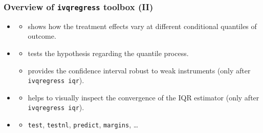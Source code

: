 \documentclass[11pt]{beamer}
\begin{document}
\begin{frame}
  \frametitle{Overview of {\tt ivqregress} toolbox (II) } 
  \begin{itemize}

    \setlength\itemsep{1.5em}

    \item {}
      \begin{itemize}
	\item {} shows how the treatment effects
	  vary at different conditional quantiles of outcome.
      \end{itemize}

    \item {}
      \begin{itemize}
	\item {} tests the hypothesis regarding the
	  quantile process.

	\item {} provides the confidence interval robust
	  to weak instruments (only after {\tt ivqregress iqr}).
      \end{itemize}

     \item {}
       \begin{itemize}
	 \item {} helps to visually inspect the
	   convergence of the IQR estimator (only after {\tt ivqregress iqr}).
	\end{itemize}

 	\item {}
       \begin{itemize}
	   \item {\tt test}, {\tt testnl}, {\tt predict}, {\tt margins}, \ldots
	\end{itemize}

  \end{itemize}
\end{frame}

\end{document}
